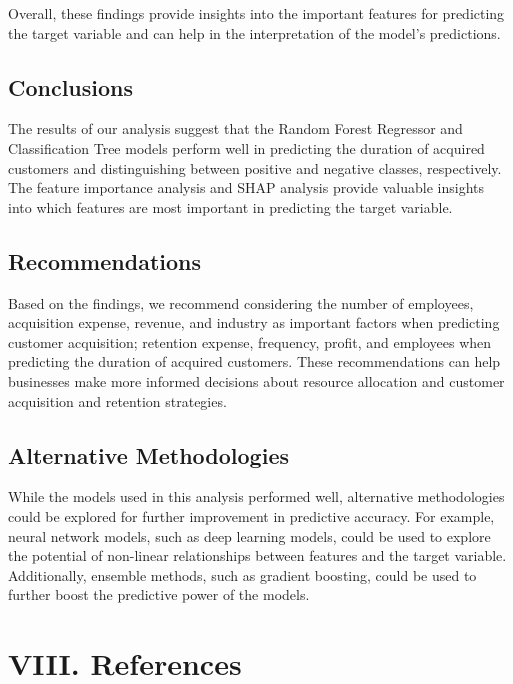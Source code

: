 Overall, these findings provide insights into the important features for
predicting the target variable and can help in the interpretation of the
model's predictions.

\hypertarget{conclusions}{%
\subsection{Conclusions}\label{conclusions}}

The results of our analysis suggest that the Random Forest Regressor and
Classification Tree models perform well in predicting the duration of
acquired customers and distinguishing between positive and negative
classes, respectively. The feature importance analysis and SHAP analysis
provide valuable insights into which features are most important in
predicting the target variable.

\hypertarget{recommendations}{%
\subsection{Recommendations}\label{recommendations}}

Based on the findings, we recommend considering the number of employees,
acquisition expense, revenue, and industry as important factors when
predicting customer acquisition; retention expense, frequency, profit,
and employees when predicting the duration of acquired customers. These
recommendations can help businesses make more informed decisions about
resource allocation and customer acquisition and retention strategies.

\hypertarget{alternative-methodologies}{%
\subsection{Alternative Methodologies}\label{alternative-methodologies}}

While the models used in this analysis performed well, alternative
methodologies could be explored for further improvement in predictive
accuracy. For example, neural network models, such as deep learning
models, could be used to explore the potential of non-linear
relationships between features and the target variable. Additionally,
ensemble methods, such as gradient boosting, could be used to further
boost the predictive power of the models.

\hypertarget{viii-references}{%
\section{VIII. References}\label{viii-references}}

